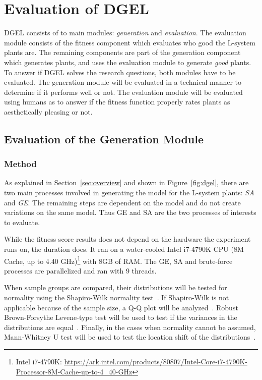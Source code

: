\chapter[Evaluation of DGEL]{Evaluation of \gls{DGEL}}
\gls{DGEL} consists of to main modules: \textit{generation} and \textit{evaluation}.
The evaluation module consists of the fitness component which evaluates who good the \gls{L-system} plants are.
The remaining components are part of the generation component which generates plants, and uses the evaluation module to generate \textit{good} plants.
To answer if \gls{DGEL} solves the research questions, both modules have to be evaluated.
The generation module will be evaluated in a technical manner to determine if it performs well or not.
The evaluation module will be evaluated using humans as to answer if the fitness function properly rates plants as aesthetically pleasing or not.

\section{Evaluation of the Generation Module}
\subsection{Method}
As explained in Section~\ref{sec:overview} and shown in Figure~\ref{fig:dgel}, there are two main processes involved in generating the model for the \gls{L-system} plants: \textit{\gls{SA}} and \textit{\gls{GE}}.
The remaining steps are dependent on the model and do not create variations on the same model.
Thus \gls{GE} and \gls{SA} are the two processes of interests to evaluate.

While the fitness score results does not depend on the hardware the experiment runs on, the duration does.
It ran on a water-cooled Intel i7-4790K CPU (8M Cache, up to 4.40 GHz)\footnote{Intel i7-4790K: \url{https://ark.intel.com/products/80807/Intel-Core-i7-4790K-Processor-8M-Cache-up-to-4_40-GHz}} with 8GB of RAM.
The \gls{GE}, \gls{SA} and brute-force processes are parallelized and ran with 9 threads.

When sample groups are compared, their distributions will be tested for normality using the Shapiro-Wilk normality test~\cite{1965Shapiro}.
If Shapiro-Wilk is not applicable because of the sample size, a Q-Q plot will be analyzed~\cite{1968Wilk}.
Robust Brown-Forsythe Levene-type test will be used to test if the variances in the distributions are equal~\cite{1974Brown}.
Finally, in the cases when normality cannot be assumed, Mann-Whitney U test will be used to test the location shift of the distributions~\cite{1947Mann}.

